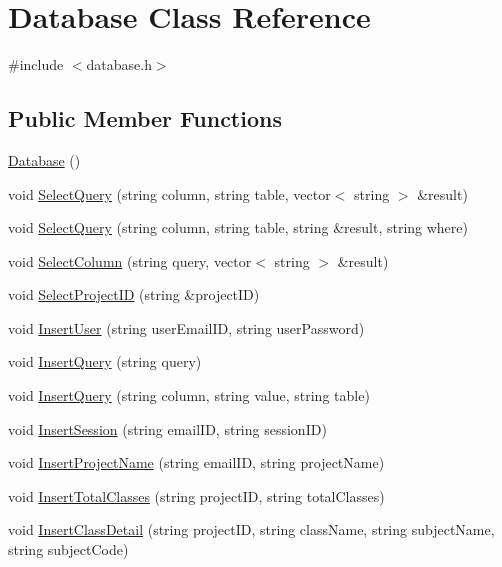 \hypertarget{classDatabase}{\section{Database Class Reference}
\label{classDatabase}
}


{\ttfamily \#include $<$database.\-h$>$}

\subsection*{Public Member Functions}
\begin{DoxyCompactItemize}
\item 
\hyperlink{classDatabase_a4703c80e6969d33565ea340f768fdadf}{Database} ()
\item 
void \hyperlink{classDatabase_aec3d0f84e49a58a59f254c90193c1303}{Select\-Query} (string column, string table, vector$<$ string $>$ \&result)
\item 
void \hyperlink{classDatabase_a958467134aa40db133cdf6d46ab52c86}{Select\-Query} (string column, string table, string \&result, string where)
\item 
void \hyperlink{classDatabase_a6fb9e249cb97830af86c00804bb209a2}{Select\-Column} (string query, vector$<$ string $>$ \&result)
\item 
void \hyperlink{classDatabase_a20f7ccadac8f3b67d4344f7da4594eda}{Select\-Project\-I\-D} (string \&project\-I\-D)
\item 
void \hyperlink{classDatabase_a7070d93bf44c5f90504944f54607b9b0}{Insert\-User} (string user\-Email\-I\-D, string user\-Password)
\item 
void \hyperlink{classDatabase_a63d8c1af7507b1dcdc81a411f9a0b4b4}{Insert\-Query} (string query)
\item 
void \hyperlink{classDatabase_a513326ea43b2455177731fbc92c4bf4f}{Insert\-Query} (string column, string value, string table)
\item 
void \hyperlink{classDatabase_a478f862bd338a92b13c2899bb4e28843}{Insert\-Session} (string email\-I\-D, string session\-I\-D)
\item 
void \hyperlink{classDatabase_aae19d9dac16779519f94cc68e29cb57d}{Insert\-Project\-Name} (string email\-I\-D, string project\-Name)
\item 
void \hyperlink{classDatabase_ad6af2dc859cda41dcbdad9cd51f5c38b}{Insert\-Total\-Classes} (string project\-I\-D, string total\-Classes)
\item 
void \hyperlink{classDatabase_ad0052cd5a48f5ba3233395096ba6e422}{Insert\-Class\-Detail} (string project\-I\-D, string class\-Name, string subject\-Name, string subject\-Code)

\end{DoxyCompactItemize}
